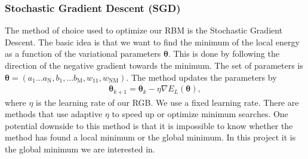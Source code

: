 
\subsubsection{Stochastic Gradient Descent (SGD)} \label{sec_SGD}
The method of choice used to optimize our RBM is the Stochastic Gradient Descent. The basic idea is that we want to find the minimum of the local energy as a function of the variational parameters $\boldsymbol{\theta}$. This is done by following the direction of the negative gradient towards the minimum. The set of parameters is $\boldsymbol{\theta} = (a_1...a_\text{N},b_1,...b_\text{M},w_{11},w_{\text{NM}})$. The method updates the parameters by 
\begin{align}
	\label{parameter}
\boldsymbol{\theta}_{k+1} = \boldsymbol{\theta}_k - \eta \nabla E_L(\boldsymbol{\theta}),
\end{align}
where $\eta$ is the learning rate of our RGB. We use a fixed learning rate. There are methods that use adaptive $\eta$ to speed up or optimize minimum searches. One potential downside to this method is that it is impossible to know whether the method has found a local minimum or the global minimum. In this project it is the global minimum we are interested in.

